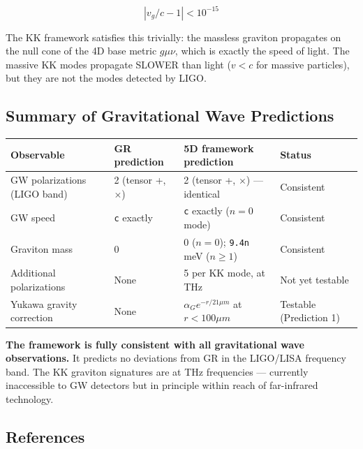 \documentclass[aps,prd,preprint,superscriptaddress,longbibliography,floatfix]{revtex4-2}
\theoremstyle{remark}
\begin{document}
\begin{equation}
    |v_g/c - 1| < 10^{-15}
\end{equation}
\cite{LIGOMultimessenger2017}

The KK framework satisfies this trivially: the massless graviton propagates on the null cone of the 4D base metric $g\mu\nu$, which is exactly the speed of light. The massive KK modes propagate SLOWER than light ($v < c$ for massive particles), but they are not the modes detected by LIGO.



\subsection{Summary of Gravitational Wave Predictions}


\begin{table}[H]
\begin{ruledtabular}
\begin{tabular}{p{3.8cm}p{3.8cm}p{3.8cm}p{3.8cm}}
Observable & GR prediction & 5D framework prediction & Status \\
\hline
GW polarizations (LIGO band) & 2 (tensor +, $\times$) & 2 (tensor +, $\times$) --- identical & Consistent \\
GW speed & \texttt{c} exactly & \texttt{c} exactly ($n=0$ mode) & Consistent \\
Graviton mass & 0 & 0 ($n=0$); \texttt{9.4n} meV ($n\geq1$) & Consistent \\
Additional polarizations & None & 5 per KK mode, at THz & Not yet testable \\
Yukawa gravity correction & None & $\alpha_G e^{-r/21\mu m}$ at $r < 100 \mu m$ & Testable (Prediction 1) \\
\end{tabular}
\end{ruledtabular}
\end{table}

\textbf{The framework is fully consistent with all gravitational wave observations.} It predicts no deviations from GR in the LIGO/LISA frequency band. The KK graviton signatures are at THz frequencies --- currently inaccessible to GW detectors but in principle within reach of far-infrared technology.



\subsection{References}
\end{document}
